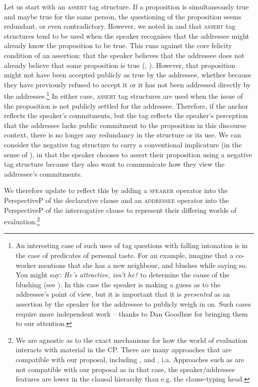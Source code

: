 \documentclass[output=paper,colorlinks,citecolor=brown]{langscibook}
\begin{document}
Let us start with an \textsc{assert} tag structure. If a proposition is simultaneously true and maybe true for the same person, the questioning of the proposition seems redundant, or even contradictory. However, we noted in  and  that \textsc{assert} tag structures tend to be used when the speaker recognises that the addressee might already know the proposition to be true. This runs against the core felicity condition of an assertion: that the speaker believes that the addressee does not already believe that some proposition is true (\citealt{searle1969}, \citealt{farkas2022}). However, that proposition might not have been accepted publicly as true by the addressee, whether because they have previously refused to accept it or it has not been addressed directly by the addressee.\footnote{An interesting case of such uses of tag questions with falling intonation is in the case of predicates of personal taste. For an example, imagine that a co-worker mentions that she has a new neighbour, and blushes while saying so. You might say: \textit{He's attractive, isn't he?} to determine the cause of the blushing (see \citealt{malsteph2015}). In this case the speaker is making a guess as to the addressee's point of view, but it is important that it is \textit{presented} as an assertion by the speaker for the addressee to publicly weigh in on. Such cases require more independent work -- thanks to Dan Goodhue for bringing them to our attention.} In either case, \textsc{assert} tag structures are used when the issue of the proposition is not publicly settled for the addressee. Therefore, if the anchor reflects the speaker's commitments, but the tag reflects the speaker's perception that the addressee lacks public commitment to the proposition in this discourse context, there is no longer any redundancy in the structure or its use. We can consider the negative tag structure to carry a conventional implicature (in the sense of \citealt{potts2005}), in that the speaker chooses to assert their proposition using a negative tag structure because they also want to communicate how they view the addressee's commitments.

We therefore update  to reflect this by adding a \textsc{speaker} operator into the PerspectiveP of the declarative clause and an \textsc{addressee} operator into the PerspectiveP of the interrogative clause to represent their differing worlds of evaluation.\footnote{We are agnostic as to the exact mechanisms for how the world of evaluation interacts with material in the CP. There are many approaches that are compatible with our proposal, including \citet{tsoulaskural1999}, \citet{speastenny2003} and \citet{schwarz2012}, i.a. Approaches such as \citet{sigurdsson2014} are not compatible with our proposal as in that case, the speaker/addressee features are lower in the clausal hierarchy than e.g. the clause-typing head.}
\end{document}
